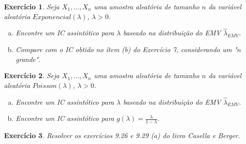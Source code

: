 \documentclass[letter,11pt]{article}
\newtheorem{exer}{Exercício}
\begin{document}
\begin{exer} \rm
Seja $X_1, \ldots, X_n$ uma amostra aleatória de tamanho $n$ da variável aleatória $Exponencial(\lambda)$, $\lambda > 0$. 
\begin{enumerate}[a)]
  \item Encontre um IC assintótico para $\lambda$ baseado na distribuição do EMV $\hat \lambda_{EMV}$.
  \item Compare com o IC obtido no ítem (b) do Exercício 7, considerando um "$n$ grande".
\end{enumerate}
\end{exer}


\begin{exer} \rm
Seja $X_1, \ldots, X_n$ uma amostra aleatória de tamanho $n$ da variável aleatória $Poisson(\lambda)$, $\lambda > 0$. 
\begin{enumerate}[a)]
  \item Encontre um IC assintótico para $\lambda$ baseado na distribuição do EMV $\hat \lambda_{EMV}$.
  \item Encontre um IC assintótico para $g(\lambda) = \frac{\lambda}{1-\lambda}$.
\end{enumerate}
\end{exer}



\begin{exer} \rm
Resolver os exercícios 9.26  e 9.29 (a) do livro Casella e Berger.
\end{exer}


\end{document}

